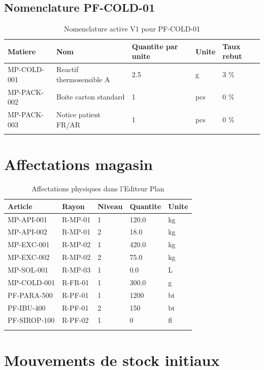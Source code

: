 \documentclass[11pt,a4paper]{article}
\begin{document}
\subsection{Nomenclature PF-COLD-01}

\begin{longtable}{|p{3cm}|p{4cm}|p{2cm}|p{2cm}|p{2cm}|}
\hline
\textbf{Matiere} & \textbf{Nom} & \textbf{Quantite par unite} & \textbf{Unite} & \textbf{Taux rebut} \\
\hline
MP-COLD-001 & Reactif thermosensible A & 2.5 & g & 3 \% \\
\hline
MP-PACK-002 & Boite carton standard & 1 & pcs & 0 \% \\
\hline
MP-PACK-003 & Notice patient FR/AR & 1 & pcs & 0 \% \\
\hline
\caption{Nomenclature active V1 pour PF-COLD-01}
\end{longtable}

\section{Affectations magasin}

\begin{longtable}{|p{3cm}|p{3cm}|p{2cm}|p{2cm}|p{2cm}|}
\hline
\textbf{Article} & \textbf{Rayon} & \textbf{Niveau} & \textbf{Quantite} & \textbf{Unite} \\
\hline
MP-API-001 & R-MP-01 & 1 & 120.0 & kg \\
\hline
MP-API-002 & R-MP-01 & 2 & 18.0 & kg \\
\hline
MP-EXC-001 & R-MP-02 & 1 & 420.0 & kg \\
\hline
MP-EXC-002 & R-MP-02 & 2 & 75.0 & kg \\
\hline
MP-SOL-001 & R-MP-03 & 1 & 0.0 & L \\
\hline
MP-COLD-001 & R-FR-01 & 1 & 300.0 & g \\
\hline
PF-PARA-500 & R-PF-01 & 1 & 1200 & bt \\
\hline
PF-IBU-400 & R-PF-01 & 2 & 150 & bt \\
\hline
PF-SIROP-100 & R-PF-02 & 1 & 0 & fl \\
\hline
\caption{Affectations physiques dans l'Editeur Plan}
\end{longtable}

\section{Mouvements de stock initiaux}
\end{document}
